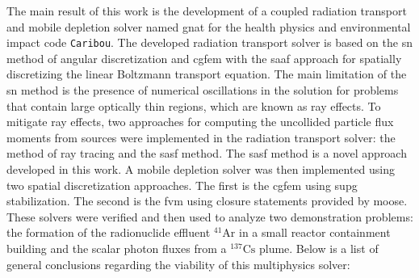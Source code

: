The main result of this work is the development of a coupled radiation transport and mobile depletion solver named \acrshort{gnat} for the health physics and environmental impact code \texttt{Caribou}. The developed radiation transport solver is based on the \acrfull{sn} method of angular discretization and \acrlong{cgfem} with the \acrlong{saaf} approach for spatially discretizing the linear Boltzmann transport equation. The main limitation of the \acrshort{sn} method is the presence of numerical oscillations in the solution for problems that contain large optically thin regions, which are known as ray effects. To mitigate ray effects, two approaches for computing the uncollided particle flux moments from sources were implemented in the radiation transport solver: the method of ray tracing and the \acrfull{sasf} method. The \acrshort{sasf} method is a novel approach developed in this work. A mobile depletion solver was then implemented using two spatial discretization approaches. The first is the \acrlong{cgfem} using \acrlong{supg} stabilization. The second is the \acrlong{fvm} using closure statements provided by \acrshort{moose}. These solvers were verified and then used to analyze two demonstration problems: the formation of the radionuclide effluent $\mathrm{^{41}Ar}$ in a small reactor containment building and the scalar photon fluxes from a $\mathrm{^{137}Cs}$ plume. Below is a list of general conclusions regarding the viability of this multiphysics solver:
